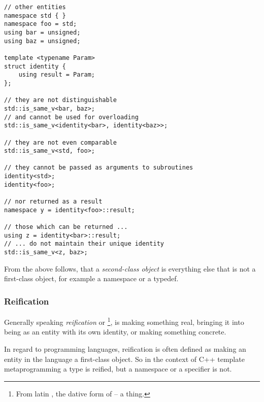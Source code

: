 \begin{verbatim}
// other entities
namespace std { }
namespace foo = std;
using bar = unsigned;
using baz = unsigned;

template <typename Param>
struct identity {
	using result = Param;
};

// they are not distinguishable
std::is_same_v<bar, baz>;
// and cannot be used for overloading
std::is_same_v<identity<bar>, identity<baz>>;

// they are not even comparable
std::is_same_v<std, foo>;

// they cannot be passed as arguments to subroutines
identity<std>;
identity<foo>;

// nor returned as a result
namespace y = identity<foo>::result;

// those which can be returned ...
using z = identity<bar>::result;
// ... do not maintain their unique identity
std::is_same_v<z, baz>;
\end{verbatim}

From the above follows, that a {\em second-class object} is everything else that
is not a first-class object, for example a namespace or a typedef.

\subsubsection{Reification}
\label{term-reification}

Generally speaking {\em reification} or \footnote{From latin
, the dative form of  -- a thing.}, is making something
real, bringing it into being as an entity with its own identity,
or making something concrete.

In regard to programming languages, reification is often defined as making
an entity in the language a first-class object. So in the context of C++ template
metaprogramming a type is reified, but a namespace or a specifier is not.

